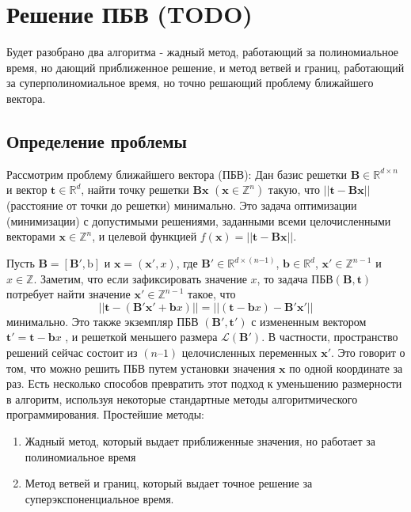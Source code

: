 \newpage

\section{Решение ПБВ (TODO)}

Будет разобрано два алгоритма - жадный метод, работающий за полиномиальное время, но дающий приближенное решение, и метод ветвей и границ, работающий за суперполиномиальное время, но точно решающий проблему ближайшего вектора.

\subsection{Определение проблемы}

Рассмотрим проблему ближайшего вектора (ПБВ): Дан базис решетки $ \mathbf{B} \in \mathbb{R}^{d \times n} $ и вектор $ \mathbf{t} \in \mathbb{R}^d $, найти точку решетки $ \mathbf{Bx} $ $ (\mathbf{x} \in \mathbb{Z}^n) $ такую, что $ ||\mathbf{t - Bx}|| $ (расстояние от точки до решетки) минимально. Это задача оптимизации (минимизации) с допустимыми решениями, заданными всеми целочисленными векторами $ \mathbf{x} \in \mathbb{Z}^n $, и целевой функцией $ f(\mathbf{x}) = ||\mathbf{t - Bx}|| $.

Пусть $ \mathbf{B} = [\mathbf{B}', \mathrm{b}] $ и $ \mathbf{x} = (\mathbf{x}', x) $, где $ \mathbf{B}' \in \mathbb{R}^{d \times \left( n \mathrm{-} 1 \right)} $, $ \mathbf{b} \in \mathbb{R}^d $, $ \mathbf{x}' \in \mathbb{Z}^{n-1} $ и $ x \in \mathbb{Z} $.
Заметим, что если зафиксировать значение $ x $, то задача $ \text{ПБВ}(\mathbf{B, t}) $ потребует найти значение $ \mathbf{x}' \in \mathbb{Z}^{n - 1} $ такое, что 
$$ ||\mathbf{t} - (\mathbf{B}'\mathbf{x}' + \mathbf{b}x)|| = ||(\mathbf{t} - \mathbf{b}x)-\mathbf{B}'\mathbf{x}'|| $$ 
минимально. Это также экземпляр ПБВ $ (\mathbf{B}', \mathbf{t}') $ с измененным вектором $ \mathbf{t}' = \mathbf{t} - \mathbf{b}x$ , и решеткой меньшего размера $ \mathcal{L}(\mathbf{B}') $. В частности, пространство решений сейчас состоит из $ (n – 1) $ целочисленных переменных $ \mathbf{x}' $. Это говорит о том, что можно решить ПБВ путем установки значения $ \mathbf{x} $ по одной координате за раз.
Есть несколько способов превратить этот подход к уменьшению размерности в алгоритм, используя некоторые стандартные методы алгоритмического программирования. Простейшие методы:

\begin{enumerate}
\item Жадный метод, который выдает приближенные значения, но работает за полиномиальное время
\item Метод ветвей и границ, который выдает точное решение за суперэкспоненциальное время.
\end{enumerate}


